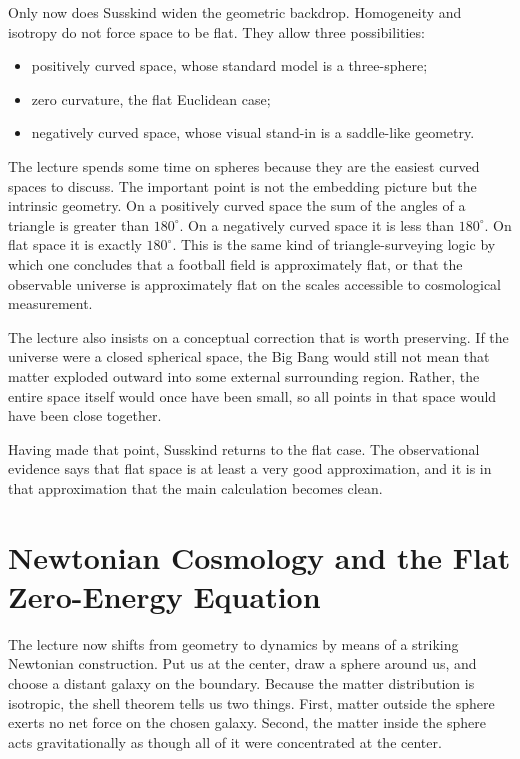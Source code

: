 Only now does Susskind widen the geometric backdrop. Homogeneity and isotropy do not force space to be flat. They allow three possibilities:
\begin{itemize}
\item positively curved space, whose standard model is a three-sphere;
\item zero curvature, the flat Euclidean case;
\item negatively curved space, whose visual stand-in is a saddle-like geometry.
\end{itemize}

The lecture spends some time on spheres because they are the easiest curved spaces to discuss. The important point is not the embedding picture but the intrinsic geometry. On a positively curved space the sum of the angles of a triangle is greater than \(180^\circ\). On a negatively curved space it is less than \(180^\circ\). On flat space it is exactly \(180^\circ\). This is the same kind of triangle-surveying logic by which one concludes that a football field is approximately flat, or that the observable universe is approximately flat on the scales accessible to cosmological measurement.

The lecture also insists on a conceptual correction that is worth preserving. If the universe were a closed spherical space, the Big Bang would still not mean that matter exploded outward into some external surrounding region. Rather, the entire space itself would once have been small, so all points in that space would have been close together.

Having made that point, Susskind returns to the flat case. The observational evidence says that flat space is at least a very good approximation, and it is in that approximation that the main calculation becomes clean.

\section{Newtonian Cosmology and the Flat Zero-Energy Equation}

The lecture now shifts from geometry to dynamics by means of a striking Newtonian construction. Put us at the center, draw a sphere around us, and choose a distant galaxy on the boundary. Because the matter distribution is isotropic, the shell theorem tells us two things. First, matter outside the sphere exerts no net force on the chosen galaxy. Second, the matter inside the sphere acts gravitationally as though all of it were concentrated at the center.

